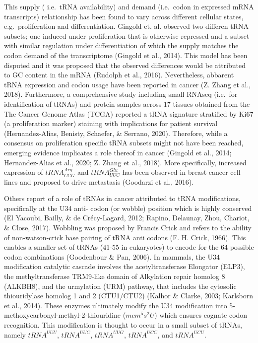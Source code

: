 \documentclass[12pt,openany]{book}
\begin{document}
This supply ( i.e.~tRNA availability) and demand (i.e.~codon in
expressed mRNA transcripts) relationship has been found to vary across
different cellular states, e.g.~proliferation and differentiation.
Gingold et. al. observed two differen tRNA subsets; one induced under
proliferation that is otherwise repressed and a subset with similar
regulation under differentiation of which the supply matches the codon
demand of the transcriptome (Gingold et al., 2014). This model has been
disputed and it was proposed that the observed differences would be
attributed to GC content in the mRNA (Rudolph et al., 2016).
Nevertheless, abbarent tRNA expression and codon usage have been
reported in cancer (Z. Zhang et al., 2018). Furthermore, a comprehensive
study including small RNAseq (i.e.~for identification of tRNAs) and
protein samples across 17 tissues obtained from the The Cancer Genome
Atlas (TCGA) reported a tRNA signature stratified by Ki67 (a
proliferation marker) staining with implications for patient survival
(Hernandez-Alias, Benisty, Schaefer, \& Serrano, 2020). Therefore, while
a consensus on proliferation specific tRNA subsets might not have been
reached, emerging evidence implicates a role thereof in cancer (Gingold
et al., 2014; Hernandez-Alias et al., 2020; Z. Zhang et al., 2018). More
specifically, increased expression of \(tRNA_{CCG}^{Arg}\) and
\(tRNA_{UUC}^{Glu}\) has been observed in breast cancer cell lines and
proposed to drive metastasis (Goodarzi et al., 2016).

Others report of a role of tRNAs in cancer attributed to tRNA
modifications, specifically at the U34 anti- codon (or wobble) position
which is highly conserved (El Yacoubi, Bailly, \& de Crécy-Lagard, 2012;
Rapino, Delaunay, Zhou, Chariot, \& Close, 2017). Wobbling was proposed
by Francis Crick and refers to the ability of non-watson-crick base
pairing of tRNA anti codons (F. H. Crick, 1966). This enables a smaller
set of tRNAs (41-55 in eukaryotes) to encode for the 64 possible codon
combinations (Goodenbour \& Pan, 2006). In mammals, the U34 modification
catalytic cascade involves the acetyltransferase Elongator (ELP3), the
methyltransferase TRM9-like domain of Alkylation repair homolog 8
(ALKBH8), and the urmylation (URM) pathway, that includes the cytosolic
thiouridylase homolog 1 and 2 (CTU1/CTU2) (Kalhor \& Clarke, 2003;
Karlsborn et al., 2014). These enzymes ultimately modify the U34
modification into 5-methoxycarbonyl-methyl-2-thiouridine (\(mcm^5s^2U\))
which ensures cognate codon recognition. This modification is thought to
occur in a small subset of tRNAs, namely \(tRNA^{UUU}\), \(tRNA^{UUC}\),
\(tRNA^{UUG}\), \(tRNA^{UCC}\), and \(tRNA^{UCU}\).
\end{document}
